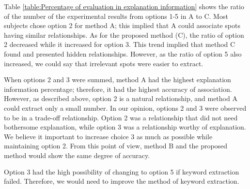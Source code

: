 \documentclass[journal]{IAENGtran}
\begin{document}
Table \ref{table:Percentage of evaluation in explanation information} shows the ratio of the number of the experimental results from options 1-5 in A to C.
Most subjects chose option 2 for method A; this implied that A could associate spots having similar relationships.
As for the proposed method (C), the ratio of option 2 decreased while it increased for option 3.
This trend implied that method C found and presented hidden relationships.
However, as the ratio of option 5 also increased, we could say that irrelevant spots were easier to extract.

When options 2 and 3 were summed, method A had the highest explanation information percentage; therefore, it had the highest accuracy of association.
However, as described above, option 2 is a natural relationship, and method A could extract only a small number.
In our opinion, options 2 and 3 were observed to be in a trade-off relationship.
Option 2 was a relationship that did not need bothersome explanation, while option 3 was a relationship worthy of explanation.
We believe it important to increase choice 3 as much as possible while maintaining option 2.
From this point of view, method B and the proposed method would show the same degree of accuracy.

Option 3 had the high possibility of changing to option 5 if keyword extraction failed.
Therefore, we would need to improve the method of keyword extraction.
\end{document}
